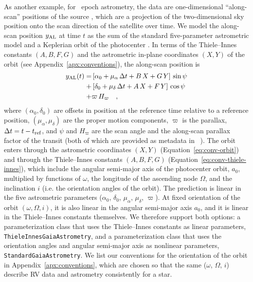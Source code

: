 \documentclass[twocolumn]{AASTeX7/aastex701}
\begin{document}
As another example, for \gaia\ epoch astrometry, the data are one-dimensional
``along-scan'' positions of the source \citep{Lindegren:2012}, which are a projection of
the two-dimensional sky position onto the scan direction of the satellite over time.
We model the along-scan position $y_{\rm AL}$ at time $t$ as the sum of the standard
five-parameter astrometric model and a Keplerian orbit of the photocenter
\citep[e.g.,][]{Halbwachs:2023}.
In terms of the Thiele--Innes constants $(A, B, F, G)$ and the astrometric in-plane
coordinates $(X, Y)$ of the orbit (see Appendix~\ref{apx:conventions}), the along-scan
position is
\begin{align}
  y_{\rm AL}(t) =
    &\left[\alpha_0 + \mu_\alpha\,\Delta t + B\,X + G\,Y\right] \, \sin\psi \nonumber \\
    + &\left[\delta_0 + \mu_\delta\,\Delta t + A\,X + F\,Y\right] \, \cos\psi \nonumber \\
    + &\varpi\,H_\varpi
  \quad ,
  \label{eq:al-model}
\end{align}
where $(\alpha_0, \delta_0)$ are offsets in position at the reference time relative to a
reference position, $(\mu_\alpha, \mu_\delta)$ are the proper motion components,
$\varpi$ is the parallax, $\Delta t = t - t_{\rm ref}$, and $\psi$ and $H_\varpi$ are
the scan angle and the along-scan parallax factor of the transit (both of which are
provided as metadata in \gaia\ ).
The orbit enters through the astrometric coordinates $(X, Y)$
(Equation~\ref{eq:conv-orbit}) and through the Thiele--Innes constants $(A, B, F, G)$
(Equation~\ref{eq:conv-thiele-innes}), which include the angular semi-major axis of the
photocenter orbit, $a_0$, multiplied by functions of $\omega$, the longitude of the
ascending node $\Omega$, and the inclination $i$ (i.e. the orientation angles of the
orbit).
The prediction is linear in the five astrometric parameters ($\alpha_0$, $\delta_0$,
$\mu_\alpha$, $\mu_\delta$, $\varpi$).
At fixed orientation of the orbit $(\omega, \Omega, i)$, it is also linear in the
angular semi-major axis $a_0$, and it is linear in the Thiele--Innes constants
themselves.
We therefore support both options: a parameterization class that uses the Thiele--Innes
constants as linear parameters, \texttt{ThieleInnesGaiaAstrometry}, and a
parameterization class that uses the orientation angles and angular semi-major axis as
nonlinear parameters, \texttt{StandardGaiaAstrometry}.
We list our conventions for the orientation of the orbit in
Appendix~\ref{apx:conventions}, which are chosen so that the same ($\omega$, $\Omega$,
$i$) describe RV data and astrometry consistently for a star.
\end{document}
